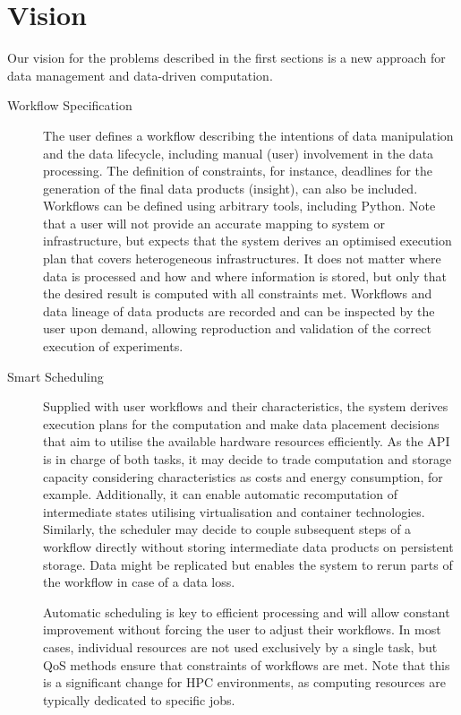 \documentclass[a4paper]{article}
\begin{document}
\section{Vision}

Our vision for the problems described in the first sections is a new approach for data management and data-driven computation.


\begin{description}
\item[Workflow Specification]

The user defines a workflow describing the intentions of data manipulation and the data lifecycle, including manual (user) involvement in the data processing.
The definition of constraints, for instance, deadlines for the generation of the final data products (insight), can also be included.
Workflows can be defined using arbitrary tools, including Python.
Note that a user will not provide an accurate mapping to system or infrastructure, but expects that the system derives an optimised execution plan that covers heterogeneous infrastructures.
It does not matter where data is processed and how and where information is stored, but only that the desired result is computed with all constraints met.
Workflows and data lineage of data products are recorded and can be inspected by the user upon demand, allowing reproduction and validation of the correct execution of experiments.

\item[Smart Scheduling]

Supplied with user workflows and their characteristics, the system derives execution plans for the computation and make data placement decisions that aim to utilise the available hardware resources efficiently.
As the API is in charge of both tasks, it may decide to trade computation and storage capacity considering characteristics as costs and energy consumption, for example. Additionally, it can enable automatic recomputation of intermediate states utilising virtualisation and container technologies.
Similarly, the scheduler may decide to couple subsequent steps of a workflow directly without storing intermediate data products on persistent storage.
Data might be replicated but enables the system to rerun parts of the workflow in case of a data loss.

Automatic scheduling is key to efficient processing and will allow constant improvement without forcing the user to adjust their workflows.
In most cases, individual resources are not used exclusively by a single task, but QoS methods ensure that constraints of workflows are met.
Note that this is a significant change for HPC environments, as computing resources are typically dedicated to specific jobs.

\end{description}



\end{document}
